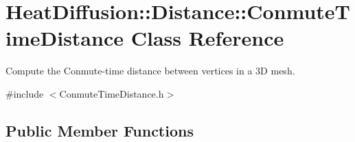 \hypertarget{classHeatDiffusion_1_1Distance_1_1ConmuteTimeDistance}{\section{Heat\-Diffusion\-:\-:Distance\-:\-:Conmute\-Time\-Distance Class Reference}
\label{classHeatDiffusion_1_1Distance_1_1ConmuteTimeDistance}
}


Compute the Conmute-\/time distance between vertices in a 3\-D mesh.  




{\ttfamily \#include $<$Conmute\-Time\-Distance.\-h$>$}

\subsection*{Public Member Functions}
